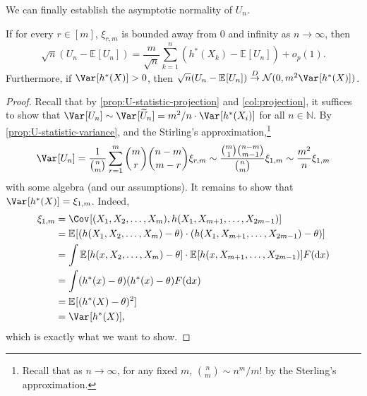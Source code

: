 We can finally establish the asymptotic normality of \(U_n\).

\begin{theorem}\label{thm:U-statistic}
	If for every \(r \in [m]\), \(\xi_{r, m}\) is bounded away from \(0\) and infinity as \(n \to \infty \), then
	\[
		\sqrt{n} (U_n - \mathbb{E}_{}[U_n] )
		= \frac{m}{\sqrt{n} } \sum_{k=1}^{n} (h^{\ast} (X_k) - \mathbb{E}_{}[U_n] ) + o_p(1).
	\]
	Furthermore, if \(\Var_{}[h^{\ast} (X)] > 0\), then \(\sqrt{n} (U_n - \mathbb{E}_{}[U_n] ) \overset{D}{\to} \mathcal{N} (0, m^2 \Var_{}[h^{\ast} (X)] )\).
\end{theorem}
\begin{proof}
	Recall that by \autoref{prop:U-statistic-projection} and \autoref{col:projection}, it suffices to show that \(\Var_{}[U_n] \sim \Var_{}[\widetilde{U} _n] = m^2 / n \cdot \Var_{}[h^{\ast} (X_i)]\) for all \(n \in \mathbb{N} \). By \autoref{prop:U-statistic-variance}, and the Stirling's approximation,\footnote{Recall that as \(n \to \infty \), for any fixed \(m\), \(\binom{n}{m} \sim n^m / m!\) by the Sterling's approximation.}
	\[
		\Var_{}[U_n]
		= \frac{1}{\binom{n}{m}} \sum_{r=1}^{m} \binom{m}{r} \binom{n-m}{m-r} \xi_{r, m}
		\sim \frac{\binom{m}{1} \binom{n-m}{m-1}}{\binom{n}{m}} \xi_{1, m}
		\sim \frac{m^2}{n} \xi_{1, m}
	\]
	with some algebra (and our assumptions). It remains to show that \(\Var_{}[h^{\ast} (X)] = \xi_{1, m}\). Indeed,
	\[
		\begin{split}
			\xi_{1, m}
			 & = \Cov_{}[(X_1, X_2, \dots , X_m), h(X_1, X_{m+1}, \dots , X_{2m-1})]                                                       \\
			 & = \mathbb{E}_{}[(h(X_1, X_2, \dots , X_m) - \theta ) \cdot (h(X_1, X_{m+1}, \dots , X_{2m-1}) - \theta ) ]                  \\
			 & = \int \mathbb{E}_{}[h(x, X_2, \dots , X_m) - \theta ] \cdot \mathbb{E}_{}[h(x, X_{m+1}, \dots , X_{2m-1})] F(\mathrm{d} x) \\
			 & = \int (h^{\ast} (x) - \theta ) (h^{\ast} (x) - \theta ) F(\mathrm{d} x)                                                    \\
			 & = \mathbb{E}_{}[(h^{\ast} (X) - \theta )^2]                                                                                 \\
			 & = \Var_{}[h^{\ast} (X)] ,
		\end{split}
	\]
	which is exactly what we want to show.
\end{proof}

